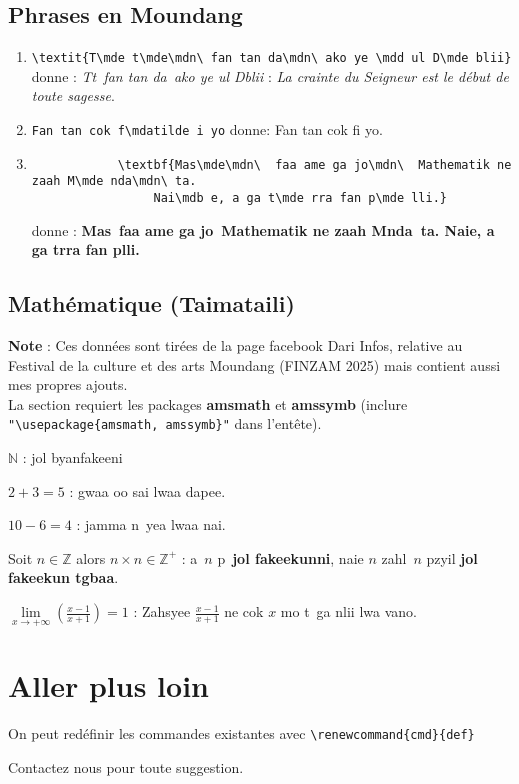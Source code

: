 \documentclass[a4paper,12pt]{article}
\begin{document}
	\subsection{Phrases en Moundang}
	\begin{enumerate}
		\item \verb|\textit{T\mde t\mde\mdn\ fan tan da\mdn\ ako ye \mdd ul D\mde blii}|  donne : \textit{T\mde t\mde\mdn\ fan tan da\mdn\ ako ye \mdd ul D\mde blii} : \textit{La crainte du Seigneur est le début de toute sagesse}.
		\item \verb|Fan tan cok f\mdatilde i yo| donne: Fan tan cok f\mdatilde i yo.
		\item \begin{verbatim}
			\textbf{Mas\mde\mdn\  faa ame ga jo\mdn\  Mathematik ne zaah M\mde nda\mdn\ ta.
				 Nai\mdb e, a ga t\mde rra fan p\mde lli.}
		\end{verbatim}
		 donne :  \textbf{Mas\mde\mdn\  faa ame ga jo\mdn\  Mathematik ne zaah M\mde nda\mdn\ ta. Nai\mdb e, a ga t\mde rra fan p\mde lli.}
	\end{enumerate}
	
 \subsection{Mathématique (Taimataili)}
 \textbf{Note} : Ces données sont tirées de la page facebook Dari Infos, relative au Festival de la culture et des arts Moundang (FINZAM 2025) mais contient aussi mes propres ajouts.\\
 La section requiert les packages \textbf{amsmath} et \textbf{amssymb} (inclure \verb|"\usepackage{amsmath, amssymb}"| dans l'entête).
 
	$\mathbb{N}$ : jol byanfakeeni
	
	$2 + 3 = 5$ : gwaa \mdb oo sai lwaa dapee.
	
	$10 - 6 = 4$ : jamma n\mde\mde\ yea lwaa nai.
	
	Soit $n \in \mathbb{Z}$ alors $n\times n \in \mathbb{Z}^+$ : \mdB a\mdn\ $n$ p\mde\ \textbf{jol fakeekunni}, nai\mdb e $n$ zahl\mde\mdn\ $n$ p\mde zyil \textbf{jol fakeekun t\mde gbaa}.
	
	$\lim\limits_{x \to + \infty}( \frac{x-1}{x+1})=1$ : Zahsyee $\frac{x-1}{x+1}$ ne cok $x$ mo t\mde\ ga n\mde\mde lii lwa va\mdn no.
	\section{Aller plus loin}
	On peut redéfinir les commandes existantes avec \verb|\renewcommand{cmd}{def}|
	
	Contactez nous pour toute suggestion.
\end{document}
